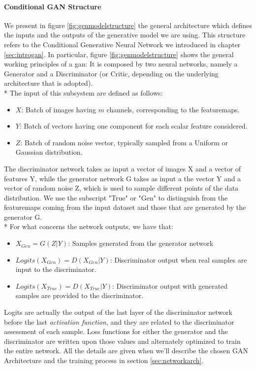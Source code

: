 \paragraph{Conditional GAN Structure} We present in figure \ref{fig:genmodelstructure} the general architecture which defines the inputs and the outputs of the generative model we are using. This structure refers to the Conditional Generative Neural Network we introduced in chapter \ref{sec:introgan}. In particular, figure \ref{fig:genmodelstructure} shows the general working principles of a \gls{gan}: It is composed by two neural networks, namely a Generator and a Discriminator (or Critic, depending on the underlying architecture that is adopted). \\* The input of this subsystem are defined as follows:
\begin{itemize}
	\item $X$: Batch of images having $m$ channels, corresponding to the \glspl{featuremap}.
	\item $Y$: Batch of vectors having one component for each scalar feature considered.
	\item $Z$: Batch of random noise vector, typically sampled from a Uniform or Gaussian distribution.
\end{itemize}

The discriminator network takes as input a vector of images X and a vector of features Y, while the generator network G takes as input a the vector  Y and a vector of random noise Z, which is used to sample different points of the data distribution. We use the subscript "True" or "Gen" to distinguish from the \glspl{featuremap} coming from the input dataset and those that are generated by the generator G.
\\* For what concerns the network outputs, we have that:
\begin{itemize}
	\item  $ X_{Gen} = G(Z|Y) $: Samples generated from the generator network
	\item  $ Logits(X_{Gen}) = D(X_{Gen}|Y) $: Discriminator output when real samples are input to the discriminator.
	\item  $ Logits(X_{True}) = D(X_{True}|Y) $: Discriminator output with generated samples are provided to the discriminator.
\end{itemize}	
Logits are actually the output of the last layer of the discriminator network before the last \textit{activation function}, and they are related to the discriminator assessment of each sample. Loss functions for either the generator and the discriminator are written upon those values and alternately optimized to train the entire network. All the details are given when we'll describe the chosen GAN Architecture and the training process in section \ref{sec:networkarch}.

